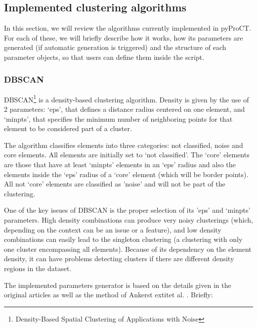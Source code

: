 \subsection{Implemented clustering algorithms}

In this section, we will review the algorithms currently implemented
in pyProCT. For each of these, we will briefly describe how it works,
how its parameters are generated (if automatic generation is triggered)
and the structure of each parameter objects, so that users can define
them inside the script.


\subsubsection[DBSCAN]{DBSCAN \cite{ester_density-based_1996}}

DBSCAN\footnote{Density-Based Spatial Clustering of Applications with Noise} 
is a density-based clustering algorithm. Density is given by the use
of 2 parameters: `eps', that defines a distance radius centered on
one element, and `minpts', that specifies the minimum number of neighboring
points for that element to be considered part of a cluster. 

The algorithm classifies elements into three categories: not classified,
noise and core elements. All elements are initially set to `not classified'.
The `core' elements are those that have at least `minpts' elements
in an `eps' radius and also the elements inside the `eps' radius of
a `core' element (which will be border points). All not `core' elements
are classified as 'noise' and will not be part of the clustering. 

One of the key issues of DBSCAN is the proper selection of its 'eps'
and `minpts' parameters. High density combinations can produce very
noisy clusterings (which, depending on the context can be an issue
or a feature), and low density combinations can easily lead to the
singleton clustering (a clustering with only one cluster encompassing
all elements). Because of its dependency on the element density, it
can have problems detecting clusters if there are different density
regions in the dataset.



The implemented parameters generator is based on the details given
in the original articles \cite{ester_density-based_1996, sander_density-based_1998-2}
as well as the method of Ankerst 	extit{et al.} \cite{ankerst_optics_1999-1}.
Briefly: 


